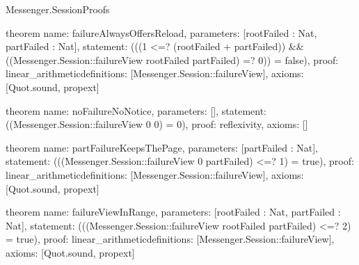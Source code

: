 \begin{lexlean}{Messenger.SessionProofs}
\begin{semanticmodule}
theorem{
  name: failureAlwaysOffersReload,
  parameters: [rootFailed : Nat, partFailed : Nat],
  statement: (((1 <=? (rootFailed + partFailed)) && ((Messenger.Session::failureView rootFailed partFailed) =? 0)) = false),
  proof: linear_arithmetic{definitions: [Messenger.Session::failureView]},
  axioms: [Quot.sound, propext]
}

theorem{
  name: noFailureNoNotice,
  parameters: [],
  statement: ((Messenger.Session::failureView 0 0) = 0),
  proof: reflexivity{},
  axioms: []
}

theorem{
  name: partFailureKeepsThePage,
  parameters: [partFailed : Nat],
  statement: (((Messenger.Session::failureView 0 partFailed) <=? 1) = true),
  proof: linear_arithmetic{definitions: [Messenger.Session::failureView]},
  axioms: [Quot.sound, propext]
}

theorem{
  name: failureViewInRange,
  parameters: [rootFailed : Nat, partFailed : Nat],
  statement: (((Messenger.Session::failureView rootFailed partFailed) <=? 2) = true),
  proof: linear_arithmetic{definitions: [Messenger.Session::failureView]},
  axioms: [Quot.sound, propext]
}
\end{semanticmodule}
\end{lexlean}
